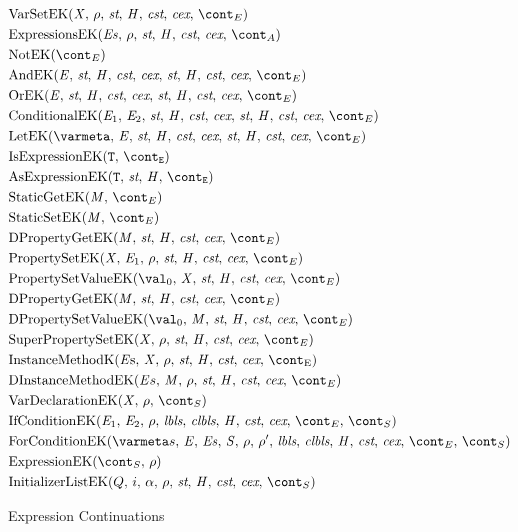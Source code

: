 \documentclass[a4paper,oneside,fleqn]{article}
\newcommand{\idmeta}{\ensuremath{\mathit{X}}}
\begin{document}
\begin{figure}[Htp]
  \begin{eqfigure}
  \begin{align}
    &\VarSetK{\idmeta}{\env}{\ExceptionHandlers}{\econt} \label{econt:varset}\\
    &\ExpressionsK{\exprs}{\env}{\acont} \label{econt:expressions}\\
    &\NotK{\econt} \label{econt:not}\\
    &\AndK{\expressionmeta}{\ExceptionHandlers}{\econt} \label{econt:and}\\
    &\OrK{\expressionmeta}{\ExceptionHandlers}{\econt} \label{econt:or}\\
    &\ConditionalK{\expressionmeta_1}{\expressionmeta_2}{\ExceptionHandlers}{\econt} \label{econt:cond}\\
    &\LetK{\varmeta}{\expressionmeta}{\ExceptionHandlers}{\econt} \label{econt:let}\\
    &\IsExpressionK \label{econt:is}\\
    &\AsExpressionK \label{econt:as}\\
    &\StaticGetK \label{econt:static-get}\\
    &\StaticSetK \label{econt:static-set}\\
    &\DPropertyGetK \label{econt:dproperty-get}\\
    &\PropertySetK \label{econt:property-set}\\
    &\PropertySetVK \label{econt:property-set}\\
    &\DPropertyGetK \label{econt:dproperty-set}\\
    &\DPropertySetVK \label{econt:dproperty-set-v}\\
    &\SuperPropertySetK \label{econt:super-property-set}\\
    &\InstanceMethodK{\strace} \label{econt:instance-method}\\
    &\DInstanceMethodK{\strace} \label{econt:dinstance-method}\\
    &\VarDeclK{\idmeta}{\env}{\scont} \label{econt:var-decl}\\
    &\IfCondK{\expressionmeta_1}{\expressionmeta_2} \label{econt:if-cond}\\
    &\ForCondK \label{econt:for-cond}\\
    &\ExpressionK{\scont}{\env} \label{econt:expression}\\
    &\InitializerListEK{Q}{i}{\loc}{\env}{\scont} \label{econt:initializer-list}
  \end{align}
  \caption{Expression Continuations}
  \label{figure:econts}
  \end{eqfigure}
\end{figure}
\end{document}
